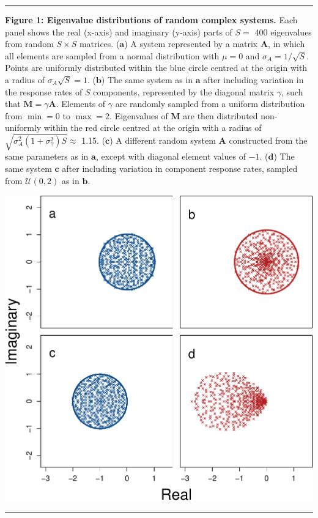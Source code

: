 \documentclass[]{article}
\begin{document}
\clearpage
\hrule
\vspace{2mm}
\textbf{Figure 1: Eigenvalue distributions of random complex systems.}
Each panel shows the real (x-axis) and imaginary (y-axis) parts of
\(S =\) 400 eigenvalues from random \(S \times S\) matrices.
(\(\textbf{a}\)) A system represented by a matrix \(\mathbf{A}\), in
which all elements are sampled from a normal distribution with
\(\mu = 0\) and \(\sigma_{A} = 1/\sqrt{S}\). Points are uniformly
distributed within the blue circle centred at the origin with a radius
of \(\sigma_{A} \sqrt{S} = 1\). (\(\textbf{b}\)) The same system as in 
\(\textbf{a}\) after including variation in the response rates of \(S\)
components, represented by the diagonal matrix \(\gamma\), such that
\(\mathbf{M} = \gamma\mathbf{A}\). Elements of \(\gamma\) are randomly
sampled from a uniform distribution from \(\min = 0\) to \(\max = 2\).
Eigenvalues of \(\mathbf{M}\) are then distributed non-uniformly within
the red circle centred at the origin with a radius of
\(\sqrt{\sigma^{2}_{A}(1 + \sigma^{2}_{\gamma})S} \approx\) 1.15.
(\(\textbf{c}\)) A different random system \(\mathbf{A}\) constructed
from the same parameters as in \(\textbf{a}\), except with diagonal
element values of \(-1\). (\(\textbf{d}\)) The same system
\(\textbf{c}\) after including variation in component response rates,
sampled from \(\mathcal{U}(0, 2)\) as in \(\textbf{b}\).

\includegraphics{fig1.pdf}
\vspace{2mm}
\hrule
\end{document}
